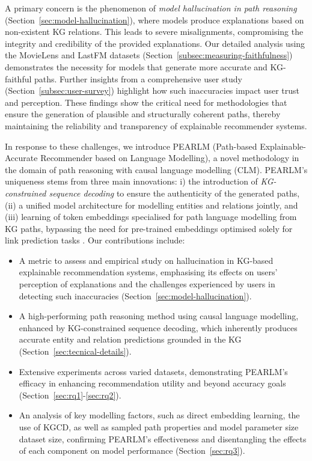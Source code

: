 \documentclass[sigconf]{acmart}
\begin{document}
A primary concern is the phenomenon of \emph{model hallucination in path reasoning} (Section~\ref{sec:model-hallucination}), where models produce explanations based on non-existent KG relations. This leads to severe misalignments, compromising the integrity and credibility of the provided explanations. Our detailed analysis using the MovieLens and LastFM datasets (Section~\ref{subsec:measuring-faithfulness}) demonstrates the necessity for models that generate more accurate and KG-faithful paths. Further insights from a comprehensive user study (Section~\ref{subsec:user-survey}) highlight how such inaccuracies impact user trust and perception. These findings show the critical need for methodologies that ensure the generation of plausible and structurally coherent paths, thereby maintaining the reliability and transparency of explainable recommender systems.

\vspace{1mm}  
In response to these challenges, we introduce PEARLM (Path-based Explainable-Accurate Recommender based on Language Modelling), a novel methodology in the domain of path reasoning with causal language modelling (CLM). PEARLM's uniqueness stems from three main innovations: i) the introduction of \emph{KG-constrained sequence decoding} to ensure the authenticity of the generated paths, (ii) a unified model architecture for modelling entities and relations jointly, and (iii) learning of token embeddings specialised for path language modelling from KG paths, bypassing the need for pre-trained embeddings optimised solely for link prediction tasks \cite{NIPS2013_1cecc7a7}. Our contributions include:
\begin{itemize}[leftmargin=5mm]
\item A metric to assess and empirical study on hallucination in KG-based explainable recommendation systems, emphasising its effects on users' perception of explanations and the challenges experienced by users in detecting such inaccuracies (Section~\ref{sec:model-hallucination}).
\item A high-performing path reasoning method using causal language modelling, enhanced by KG-constrained sequence decoding, which inherently produces accurate entity and relation predictions grounded in the KG (Section~\ref{sec:tecnical-details}).
\item Extensive experiments across varied datasets, demonstrating PEARLM's efficacy in enhancing recommendation utility and beyond accuracy goals (Section~\ref{sec:rq1}-\ref{sec:rq2}).
\item An analysis of key modelling factors, such as direct embedding learning, the use of KGCD, as well as sampled path properties and model parameter size dataset size, confirming PEARLM's effectiveness and disentangling the effects of each component on model performance (Section~\ref{sec:rq3}).
\end{itemize}
\end{document}
